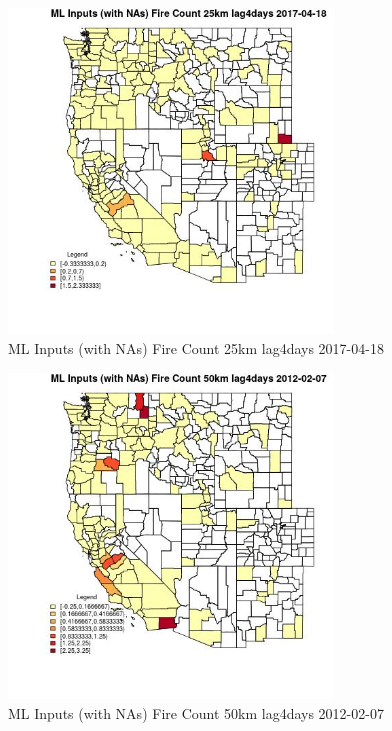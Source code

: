 \begin{figure} 
\centering  
\includegraphics[width=0.77\textwidth]{Code_Outputs/Report_ML_input_PM25_Step4_part_f_de_duplicated_aveswNAs_CountyFire_Count_25km_lag4daysMean2017-04-18.jpg} 
\caption{\label{fig:Report_ML_input_PM25_Step4_part_f_de_duplicated_aveswNAsCountyFire_Count_25km_lag4daysMean2017-04-18}ML Inputs (with NAs) Fire Count 25km lag4days 2017-04-18} 
\end{figure} 
 

\begin{figure} 
\centering  
\includegraphics[width=0.77\textwidth]{Code_Outputs/Report_ML_input_PM25_Step4_part_f_de_duplicated_aveswNAs_CountyFire_Count_50km_lag4daysMean2012-02-07.jpg} 
\caption{\label{fig:Report_ML_input_PM25_Step4_part_f_de_duplicated_aveswNAsCountyFire_Count_50km_lag4daysMean2012-02-07}ML Inputs (with NAs) Fire Count 50km lag4days 2012-02-07} 
\end{figure} 
 


